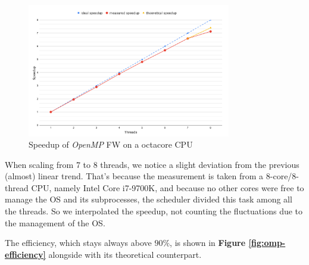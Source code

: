\begin{figure}[h!]
\centering                                                                        
\includegraphics[width=3.5in]{diagrams/openmp-speedup}
\captionsetup{justification=centering,margin=2cm}                                                                                                                                   
\caption{Speedup of \emph{OpenMP} FW on a octacore CPU}                                                                                                                                            
\label{fig:omp-speedup}                                                                                                                                                           
\end{figure}
When scaling from 7 to 8 threads, we notice a slight deviation from the previous (almost) linear trend. That's because the measurement
is taken from a 8-core/8-thread CPU, namely Intel Core i7-9700K, and because no other cores were free to manage the OS and its subprocesses, the scheduler
divided this task among all the threads. So we interpolated the speedup, not counting the fluctuations due to the management of the OS. \par

The efficiency, which stays always above $90\%$, is shown in \textbf{Figure \ref*{fig:omp-efficiency}} alongside with its theoretical counterpart.

